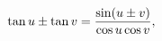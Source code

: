 \[\mathop{\tan\/}\nolimits u\pm\mathop{\tan\/}\nolimits v=\frac{\mathop{\sin\/}%
\nolimits\!\left(u\pm v\right)}{\mathop{\cos\/}\nolimits u\mathop{\cos\/}%
\nolimits v},\]